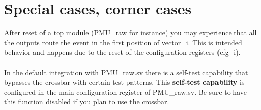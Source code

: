 \section{Special cases, corner cases}

After reset of a top module (PMU\_raw for instance) you may experience that all the outputs route the event in the first position of vector\_i. This is intended behavior and happens due to the reset of the configuration registers (cfg\_i).\\
\\
In the default integration with PMU\_raw.sv there is a self-test capability that bypasses the crossbar with certain test patterns. This \textbf{self-test capability} is configured in the main configuration register of PMU\_raw.sv. Be sure to have this function disabled if you plan to use the crossbar.